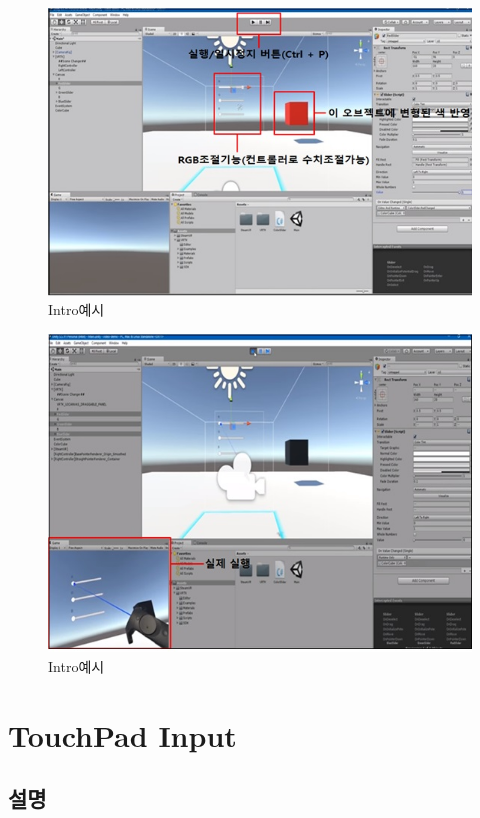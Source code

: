 \documentclass{report}
\begin{document}
    \begin{figure}[h!]
    \centering
    \includegraphics[width=1.0\textwidth]{1-1.jpg}
    \caption{Intro예시}
    \end{figure}
    
    
    \begin{figure}[h!]
    \centering
    \includegraphics[width=1.0\textwidth]{1-2.jpg}
    \caption{Intro예시}
    \end{figure}
    
    \section{TouchPad Input}
    \subsection{설명}
    
\end{document}
